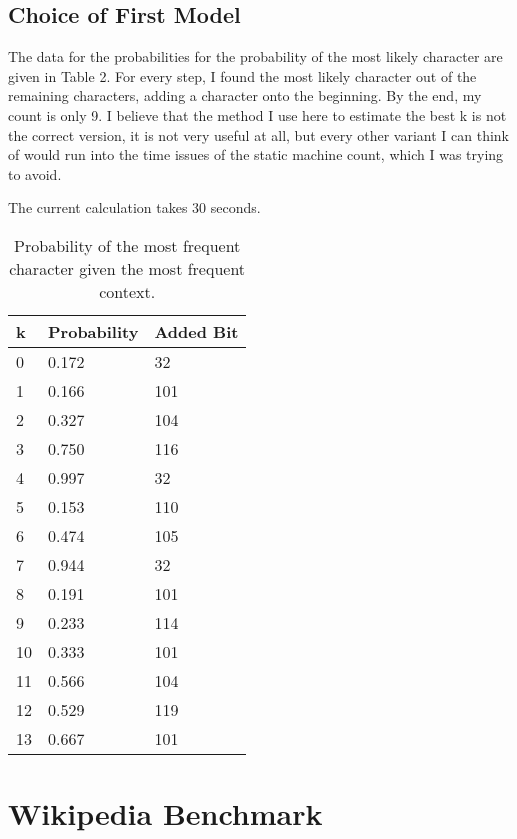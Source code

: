 \documentclass{article}
\begin{document}
\subsection{Choice of First Model}

The data for the probabilities for the probability of the most likely character are given in Table 2. For every step, I found the most likely character out of the remaining characters, adding a character onto the beginning. By the end, my count is only 9.
I believe that the method I use here to estimate the best k is not the correct version, it is not very useful at all, but every other variant I can think of would run into the time issues of the static machine count, which I was trying to avoid.

The current calculation takes 30 seconds.

\begin{table}[]
\caption{Probability of the most frequent character given the most frequent context.}
\label{probs}
\begin{center}

\begin{tabular}{|l|l|l|}
\hline
k  & Probability & Added Bit \\ \hline
0  & 0.172       & 32        \\ \hline
1  & 0.166       & 101       \\ \hline
2  & 0.327       & 104       \\ \hline
3  & 0.750       & 116       \\ \hline
4  & 0.997       & 32        \\ \hline
5  & 0.153       & 110       \\ \hline
6  & 0.474       & 105       \\ \hline
7  & 0.944       & 32        \\ \hline
8  & 0.191       & 101       \\ \hline
9  & 0.233       & 114       \\ \hline
10 & 0.333       & 101       \\ \hline
11 & 0.566       & 104       \\ \hline
12 & 0.529       & 119       \\ \hline
13 & 0.667       & 101       \\ \hline
\end{tabular}
\end{center}

\end{table}

\section{Wikipedia Benchmark}
\end{document}
